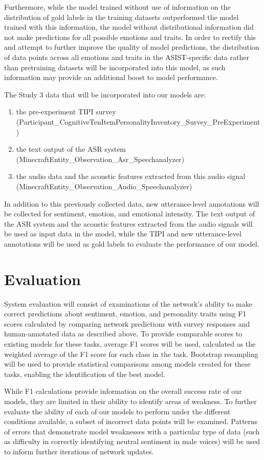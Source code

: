 Furthermore, while the model trained without use of information on the distribution
of gold labels in the training datasets outperformed the model trained with this
information, the model without distributional information did not make predictions
for all possible emotions and traits. In order to rectify this and attempt to
further improve the quality of model predictions, the distribution of data points
across all emotions and traits in the ASIST-specific data rather than pretraining
datasets will be incorporated into this model, as such information may provide an
additional boost to model performance.

The Study 3 data that will be incorporated into our models are:

\begin{enumerate}
    \item the
pre-experiment TIPI survey \\
(Participant\_CognitiveTenItemPersonalityInventory\_Survey\_PreExperiment)
    \item the
text output of the ASR system \\
(MinecraftEntity\_Observation\_Asr\_Speechanalyzer)
    \item the audio data and the
acoustic features extracted from this audio signal
(MinecraftEntity\_Observation\_Audio\_Speechanalyzer)
\end{enumerate}

In addition to this previously collected data, new
utterance-level annotations will be collected for sentiment, emotion, and
emotional intensity. The text output of the ASR system and the acoustic features
extracted from the audio signals will be used as input data in the model,
while the TIPI and new utterance-level annotations will be used as gold labels
to evaluate the performance of our model.

\section{Evaluation}

System evaluation will consist of examinations of the network's ability to make
correct predictions about sentiment, emotion, and personality traits using F1
scores calculated by comparing network predictions with survey responses and
human-annotated data as described above. To provide comparable scores to
existing models for these tasks, average F1 scores will be used, calculated as
the weighted average of the F1 score for each class in the task.  Bootstrap
resampling \cite{kohavi1995study} will be used to provide statistical
comparisons among models created for these tasks, enabling the identification
of the best model.

While F1 calculations provide information on the overall success rate of our
models, they are limited in their ability to identify areas of weakness. To
further evaluate the ability of each of our models to perform under the different
conditions available, a subset of incorrect data points will be examined.
Patterns of errors that demonstrate model weaknesses with a particular type of
data (such as difficulty in correctly identifying neutral sentiment in male
voices) will be used to inform further iterations of network updates.
